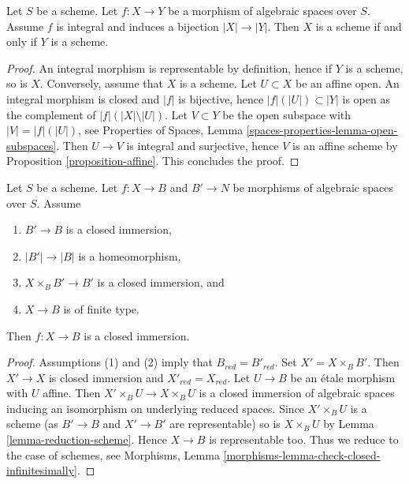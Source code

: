 \begin{lemma}
\label{lemma-integral-universally-bijective-scheme}
Let $S$ be a scheme. Let $f : X \to Y$ be a morphism of algebraic spaces
over $S$. Assume $f$ is integral and induces a bijection $|X| \to |Y|$.
Then $X$ is a scheme if and only if $Y$ is a scheme.
\end{lemma}

\begin{proof}
An integral morphism is representable by definition, hence if $Y$
is a scheme, so is $X$. Conversely, assume that $X$ is a scheme.
Let $U \subset X$ be an affine open. An integral morphism is
closed and $|f|$ is bijective, hence $|f|(|U|) \subset |Y|$
is open as the complement of $|f|(|X| \setminus |U|)$. Let
$V \subset Y$ be the open subspace with $|V| = |f|(|U|)$, see
Properties of Spaces, Lemma \ref{spaces-properties-lemma-open-subspaces}.
Then $U \to V$ is integral and surjective, hence
$V$ is an affine scheme by Proposition \ref{proposition-affine}.
This concludes the proof.
\end{proof}

\begin{lemma}
\label{lemma-check-closed-infinitesimally}
Let $S$ be a scheme.
Let $f : X \to B$ and $B' \to N$ be morphisms of algebraic spaces over $S$.
Assume
\begin{enumerate}
\item $B' \to B$ is a closed immersion,
\item $|B'| \to |B|$ is a homeomorphism,
\item $X \times_B B' \to B'$ is a closed immersion, and
\item $X \to B$ is of finite type.
\end{enumerate}
Then $f : X \to B$ is a closed immersion.
\end{lemma}

\begin{proof}
Assumptions (1) and (2) imply that $B_{red} = B'_{red}$.
Set $X' = X \times_B B'$. Then $X' \to X$ is closed immersion
and $X'_{red} = X_{red}$. Let $U \to B$ be an \'etale morphism
with $U$ affine. Then $X' \times_B U \to X \times_B U$ is a
closed immersion of algebraic spaces inducing an isomorphism
on underlying reduced spaces. Since $X' \times_B U$ is a scheme
(as $B' \to B$ and $X' \to B'$ are representable) so is
$X \times_B U$ by Lemma \ref{lemma-reduction-scheme}.
Hence $X \to B$ is representable too. Thus we reduce to the
case of schemes, see
Morphisms, Lemma \ref{morphisms-lemma-check-closed-infinitesimally}.
\end{proof}




























